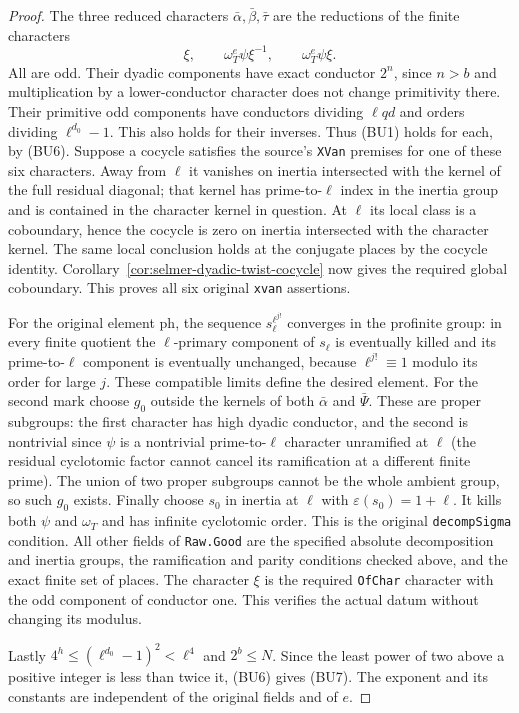 \begin{proof}
The three reduced characters
$\bar\alpha,\bar\beta,\bar\tau$ are the reductions
of the finite characters
\[
             \xi,\qquad \omega_T^e\psi\xi^{-1},
                           \qquad \omega_T^e\psi\xi.
\]
All are odd. Their dyadic components have exact conductor
$2^n$, since $n>b$ and multiplication by a lower-conductor
character does not change primitivity there. Their
primitive odd components have conductors dividing
$\ell qd$ and orders dividing $\ell^{d_0}-1$.
This also holds for their inverses.
Thus (BU1) holds for each, by (BU6).
Suppose a cocycle satisfies the source's \texttt{XVan}
premises for one of these six characters.
Away from $\ell$ it vanishes on inertia intersected
with the kernel of the full residual diagonal; that
kernel has prime-to-$\ell$ index in the inertia group
and is contained in the character kernel in question.
At $\ell$ its local class is a coboundary, hence the
cocycle is zero on inertia intersected with the
character kernel. The same local conclusion holds at
the conjugate places by the cocycle identity.
Corollary~\ref{cor:selmer-dyadic-twist-cocycle} now
gives the required global coboundary.
This proves all six original \texttt{xvan} assertions.

For the original element $\mathrm{ph}$, the sequence
$s_\ell^{\ell^{j!}}$ converges in the profinite group:
in every finite quotient the $\ell$-primary component
of $s_\ell$ is eventually killed and its prime-to-$\ell$
component is eventually unchanged, because
$\ell^{j!}\equiv1$ modulo its order for large $j$.
These compatible limits define the desired element.
For the second mark choose $g_0$ outside the kernels of
both $\bar\alpha$ and $\bar\Psi$. These are proper
subgroups: the first character has high dyadic
conductor, and the second is nontrivial since $\psi$
is a nontrivial prime-to-$\ell$ character unramified
at $\ell$ (the residual cyclotomic factor cannot cancel
its ramification at a different finite prime).
The union of two proper subgroups cannot be the whole ambient group,
so such $g_0$ exists. Finally choose $s_0$ in inertia
at $\ell$ with $\varepsilon(s_0)=1+\ell$.
It kills both $\psi$ and $\omega_T$ and has infinite
cyclotomic order. This is the original
\texttt{decompSigma} condition.
All other fields of \texttt{Raw.Good} are the
specified absolute decomposition and inertia groups,
the ramification and parity conditions checked above,
and the exact finite set of places. The character
$\xi$ is the required \texttt{OfChar} character
with the odd component of conductor one. This verifies
the actual datum without changing its modulus.

Lastly $4^h\le(\ell^{d_0}-1)^2<\ell^4$ and $2^b\le N$.
Since the least power of two above a positive integer
is less than twice it, (BU6) gives (BU7).
The exponent and its constants are independent of
the original fields and of $e$.
\end{proof}

